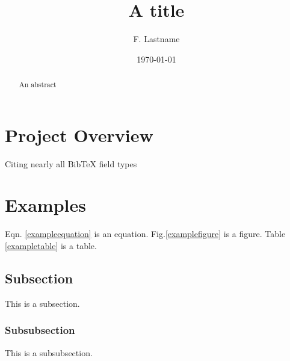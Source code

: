 \documentclass[12pt] {article}
\begin{document}
\title{A title}
\author{F. Lastname}
\date{\today}

\clearpage\maketitle
\thispagestyle{empty}

\begin{abstract}
An abstract
\end{abstract}

\newpage

\tableofcontents

\listoffigures

\listoftables


\newpage

\section{Project Overview}
Citing nearly all BibTeX field types%


\section{Examples}
Eqn. \ref{exampleequation} is an equation. Fig.\ref{examplefigure} is a figure. Table \ref{exampletable} is a table.

\subsection{Subsection}
This is a subsection.

\subsubsection{Subsubsection}
This is a subsubsection. 
\end{document}
